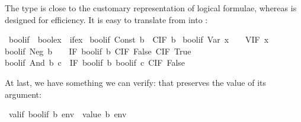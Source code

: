 \begin{isabellebody}
\begin{isamarkuptext}
The type  is close to the customary representation of logical
formulae, whereas  is designed for efficiency. It is easy to
translate from  into :%
\end{isamarkuptext}%
\isamarkuptrue%
\isamarkupfalse%
\ bool{}if\ {}{}\ {}boolex\ {}\ ifex{}\ \isanewline
{}bool{}if\ {}Const\ b{}\ {}\ CIF\ b{}\ {}\isanewline
{}bool{}if\ {}Var\ x{}\ \ \ {}\ VIF\ x{}\ {}\isanewline
{}bool{}if\ {}Neg\ b{}\ \ \ {}\ IF\ {}bool{}if\ b{}\ {}CIF\ False{}\ {}CIF\ True{}{}\ {}\isanewline
{}bool{}if\ {}And\ b\ c{}\ {}\ IF\ {}bool{}if\ b{}\ {}bool{}if\ c{}\ {}CIF\ False{}{}%
\begin{isamarkuptext}%
\noindent
At last, we have something we can verify: that  preserves the
value of its argument:%
\end{isamarkuptext}%
\isamarkuptrue%
\isamarkupfalse%
\ {}valif\ {}bool{}if\ b{}\ env\ {}\ value\ b\ env{}%

\end{isabellebody}
